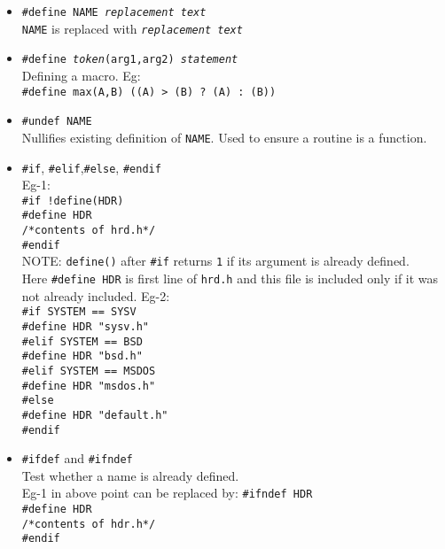 \begin{minipage}{\linewidth}
\begin{itemize}
    \item \texttt{\#define NAME \textit{replacement text}} \\
    \texttt{NAME} is replaced with \texttt{\textit{replacement text}} \\
    \item \texttt{\#define \textit{token}(arg1,arg2) \textit{statement}} \\
    Defining a macro. Eg: \\
    \texttt{\#define max(A,B) ((A) > (B) ? (A) : (B))}
    \item \texttt{\#undef NAME} \\
    Nullifies existing definition of \texttt{NAME}. Used to ensure a routine is a function.\\
    \item \texttt{\#if}, \texttt{\#elif},\texttt{\#else}, \texttt{\#endif}\\
    Eg-1:\\
    \texttt{\#if !define(HDR)}\\
    \texttt{\#define HDR}\\
    \texttt{/*contents of hrd.h*/}\\
    \texttt{\#endif}\\
    NOTE: \texttt{define()} after \texttt{\#if} returns \texttt{1} if its argument is already defined.\\ 
    Here \texttt{\#define HDR} is first line of \texttt{hrd.h} and this file is included only if it was not already included.
    Eg-2:\\
    \texttt{\#if SYSTEM == SYSV }\\
    \qquad \texttt{\#define HDR "sysv.h"}\\
    \texttt{\#elif SYSTEM == BSD}\\
    \qquad \texttt{\#define HDR "bsd.h"}\\
    \texttt{\#elif SYSTEM == MSDOS}\\
    \qquad \texttt{\#define HDR "msdos.h"}\\
    \texttt{\#else}\\
    \qquad \texttt{\#define HDR "default.h"}\\
    \texttt{\#endif}\\
    \item \texttt{\#ifdef}  and \texttt{\#ifndef}\\
    Test whether a name is already defined.\\
    Eg-1 in above point can be replaced by:
    \texttt{\#ifndef HDR}\\
    \texttt{\#define HDR}\\
    \texttt{/*contents of hdr.h*/ }\\
    \texttt{\#endif}\\
\end{itemize}
\end{minipage}